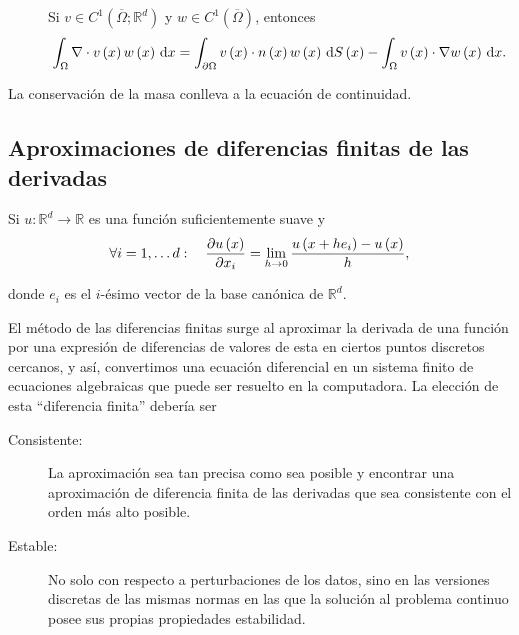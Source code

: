 \begin{theorem}
\begin{description}
		\item[]

		      Si $v\in C^{1}\left(\overline{\Omega};\mathbb{R}^{d}\right)$ y
		      $w\in C^{1}\left(\overline{\Omega}\right)$, entonces
		      \begin{equation*}
			      \int_{\Omega}\nabla\cdot v\left(x\right)
			      w\left(x\right)
			      \dl x=
			      \int_{\partial\Omega}
			      v\left(x\right)\cdot
			      n\left(x\right)
			      w\left(x\right)
			      \dl{S\left(x\right)}-
			      \int_{\Omega}
			      v\left(x\right)\cdot
			      \nabla w\left(x\right)
			      \dl x.
		      \end{equation*}
	\end{description}
\end{theorem}

La conservación de la masa conlleva a la ecuación de continuidad.

\subsection{Aproximaciones de diferencias finitas de las derivadas}

Si $u\colon\mathbb{R}^d\to\mathbb{R}$ es una función suficientemente
suave y
\begin{equation*}
	\forall i=1,\dotsc d:\quad
	\diffp{u\left(x\right)}{x_{i}}=
	\lim\limits_{h\to0}
	\dfrac{
		u\left(x+he_{i}\right)-
		u\left(x\right)}{h},
\end{equation*}

donde $e_{i}$ es el $i$-ésimo vector de la base canónica de
$\mathbb{R}^d$.

El método de las diferencias finitas surge al aproximar la derivada
de una función por una expresión de diferencias de valores de esta en
ciertos puntos discretos cercanos, y así, convertimos una ecuación
diferencial en un sistema finito de ecuaciones algebraicas que puede
ser resuelto en la computadora.
La elección de esta ``diferencia finita'' debería ser

\begin{description}
	\item[Consistente:]

	      La aproximación sea tan precisa como sea posible y encontrar
	      una aproximación de diferencia finita de las derivadas que
	      sea consistente con el orden más alto posible.

	\item[Estable:]

	      No solo con respecto a perturbaciones de los datos, sino
	      en las versiones discretas de las mismas normas en las que la
	      solución al problema continuo posee sus propias propiedades
	      estabilidad.
\end{description}

